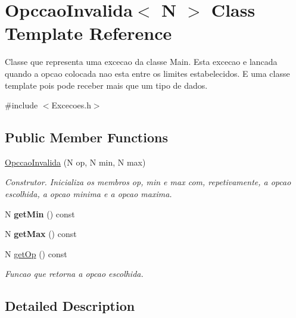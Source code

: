 \hypertarget{class_opccao_invalida}{}\section{Opccao\+Invalida$<$ N $>$ Class Template Reference}
\label{class_opccao_invalida}


Classe que representa uma excecao da classe Main. Esta excecao e lancada quando a opcao colocada nao esta entre os limites estabelecidos. E uma classe template pois pode receber mais que um tipo de dados.  




{\ttfamily \#include $<$Excecoes.\+h$>$}

\subsection*{Public Member Functions}
\begin{DoxyCompactItemize}
\item 
\hyperlink{class_opccao_invalida_a19b191db4d1cc8c074c24a940571dd4b}{Opccao\+Invalida} (N op, N min, N max)
\begin{DoxyCompactList}\small\item\em Construtor. Inicializa os membros op, min e max com, repetivamente, a opcao escolhida, a opcao minima e a opcao maxima. \end{DoxyCompactList}\item 
\hypertarget{class_opccao_invalida_abac2e9c809f6b1dc5e0179e28604f528}{}N {\bfseries get\+Min} () const \label{class_opccao_invalida_abac2e9c809f6b1dc5e0179e28604f528}

\item 
\hypertarget{class_opccao_invalida_a98bb7934220a9b27b9da823207b72db3}{}N {\bfseries get\+Max} () const \label{class_opccao_invalida_a98bb7934220a9b27b9da823207b72db3}

\item 
N \hyperlink{class_opccao_invalida_ac9afa1ee68970cddd39a9873fd2c357f}{get\+Op} () const 
\begin{DoxyCompactList}\small\item\em Funcao que retorna a opcao escolhida. \end{DoxyCompactList}\end{DoxyCompactItemize}


\subsection{Detailed Description}
